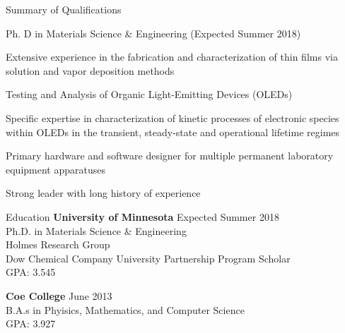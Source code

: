\documentclass{resume} %
\begin{document}

\begin{rSection}{Summary of Qualifications}
\item Ph. D in Materials Science \& Engineering (Expected Summer 2018)
\item Extensive experience in the fabrication and characterization of thin films via solution and vapor deposition methods
\item Testing and Analysis of Organic Light-Emitting Devices (OLEDs)
\item Specific expertise in characterization of kinetic processes of electronic species within OLEDs in the transient, steady-state and operational lifetime regimes
\item Primary hardware and software designer for multiple permanent laboratory equipment apparatuses
\item Strong leader with long history of experience


\end{rSection}


\begin{rSection}{Education}
{\bf University of Minnesota} \hfill { Expected Summer 2018} \\
Ph.D. in Materials Science \& Engineering \\
Holmes Research Group \\
Dow Chemical Company University Partnership Program Scholar \\
GPA: 3.545

{\bf Coe College} \hfill { June 2013} \\ 
B.A.s in Phyisics, Mathematics, and Computer Science\\
GPA: 3.927 

\end{rSection}

\end{document}
